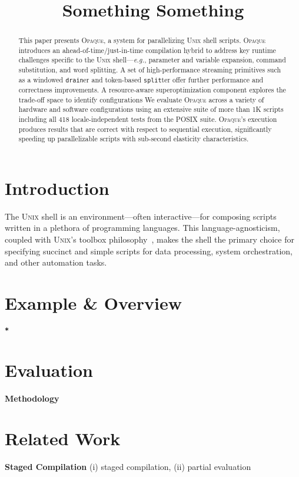 \documentclass[sigplan, screen, review, anonymous]{acmart}
\newcommand{\eg}{{\em e.g.}, }
\newcommand{\heading}[1]{\vspace{4pt}\noindent\textbf{#1}\enspace}
\newcommand{\ttt}[1]{\texttt{#1}}
\newcommand{\unix}{{\scshape Unix}\xspace}
\newcommand{\sys}{{\scshape Opaque}\xspace}
\newcommand{\kk}[1]{[{\color{magenta}kk: #1}]}
\newcommand{\str}{{\color{red}\textbf{\ttt{*}}}}
\begin{document}
\title{Something Something}

\begin{abstract}
This paper presents \sys, a system for parallelizing \unix shell scripts. 
\sys introduces an ahead-of-time/just-in-time compilation hybrid to address key runtime challenges specific to the \unix shell---\eg parameter and variable expansion, command substitution, and word splitting.
A set of high-performance streaming primitives such as a windowed \ttt{drain}er and token-based \ttt{split}ter offer further  performance and correctness improvements.
A resource-aware superoptimization component explores the trade-off space to identify configurations 
We evaluate \sys across a variety of hardware and software configurations using an extensive suite of more than 1K scripts including all 418 locale-independent tests from the POSIX suite.
\sys's execution produces results that are correct with respect to sequential execution, significantly speeding up parallelizable scripts with sub-second elasticity characteristics. %
\end{abstract}

\maketitle

\section{Introduction}
\label{intro}

The \unix shell is an environment---often interactive---for composing scripts written in a plethora of programming languages.
This language-agnosticism, coupled with \unix's toolbox philosophy~\cite{mcilroy1978unix}, makes the shell the primary choice for specifying succinct and simple scripts for data processing, system orchestration, and other automation tasks.

\section{Example \& Overview}
\label{overview}

\str

\section{Evaluation}
\label{eval}

\heading{Methodology}

\section{Related Work}

\heading{Staged Compilation}
(i) staged compilation, (ii) partial evaluation
 


{\small
  
}
\end{document}
